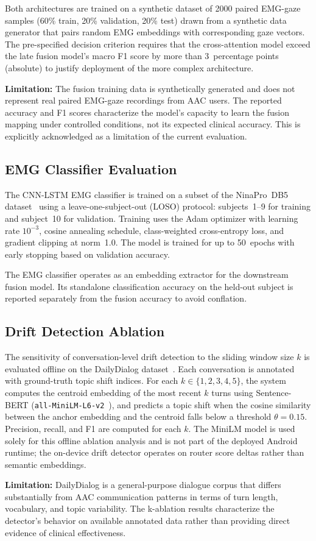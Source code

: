 Both architectures are trained on a synthetic dataset of 2000 paired EMG-gaze samples (60\% train, 20\% validation, 20\% test) drawn from a synthetic data generator that pairs random EMG embeddings with corresponding gaze vectors. The pre-specified decision criterion requires that the cross-attention model exceed the late fusion model's macro F1 score by more than 3~percentage points (absolute) to justify deployment of the more complex architecture.

\textbf{Limitation:} The fusion training data is synthetically generated and does not represent real paired EMG-gaze recordings from AAC users. The reported accuracy and F1 scores characterize the model's capacity to learn the fusion mapping under controlled conditions, not its expected clinical accuracy. This is explicitly acknowledged as a limitation of the current evaluation.

\subsection{EMG Classifier Evaluation}
\label{sec:emg_eval}

The CNN-LSTM EMG classifier is trained on a subset of the NinaPro~DB5 dataset~\cite{ninapro} using a leave-one-subject-out (LOSO) protocol: subjects~1--9 for training and subject~10 for validation. Training uses the Adam optimizer with learning rate $10^{-3}$, cosine annealing schedule, class-weighted cross-entropy loss, and gradient clipping at norm~1.0. The model is trained for up to 50~epochs with early stopping based on validation accuracy.

The EMG classifier operates as an embedding extractor for the downstream fusion model. Its standalone classification accuracy on the held-out subject is reported separately from the fusion accuracy to avoid conflation.

\subsection{Drift Detection Ablation}
\label{sec:drift_eval}

The sensitivity of conversation-level drift detection to the sliding window size $k$ is evaluated offline on the DailyDialog dataset~\cite{dailydialog}. Each conversation is annotated with ground-truth topic shift indices. For each $k \in \{1, 2, 3, 4, 5\}$, the system computes the centroid embedding of the most recent $k$ turns using Sentence-BERT (\texttt{all-MiniLM-L6-v2}~\cite{minilm}), and predicts a topic shift when the cosine similarity between the anchor embedding and the centroid falls below a threshold $\theta = 0.15$. Precision, recall, and F1 are computed for each $k$. The MiniLM model is used solely for this offline ablation analysis and is not part of the deployed Android runtime; the on-device drift detector operates on router score deltas rather than semantic embeddings.

\textbf{Limitation:} DailyDialog is a general-purpose dialogue corpus that differs substantially from AAC communication patterns in terms of turn length, vocabulary, and topic variability. The k-ablation results characterize the detector's behavior on available annotated data rather than providing direct evidence of clinical effectiveness.
